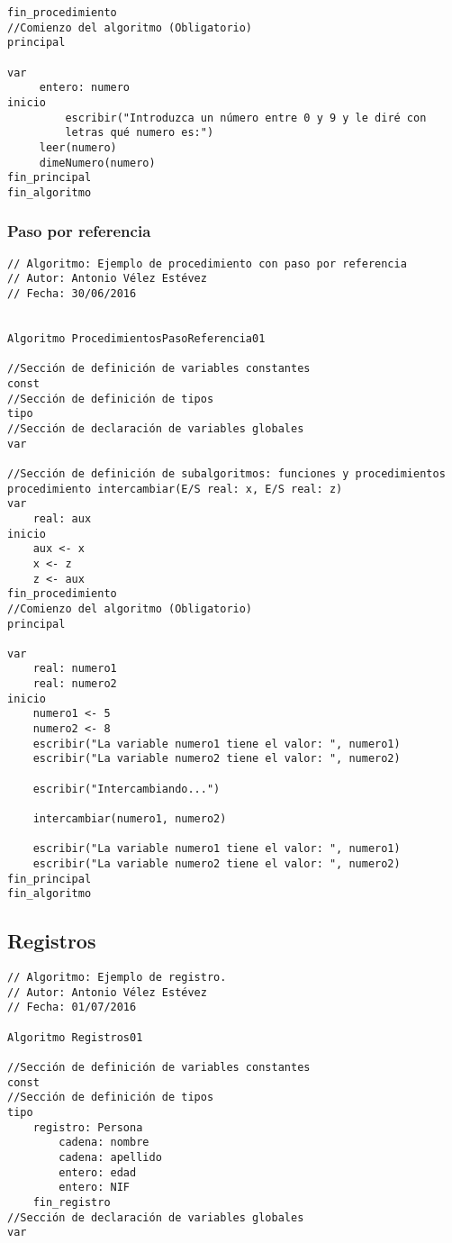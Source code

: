 \documentclass{article}
\begin{document}
\begin{appendices}
\begin{lstlisting}[language = pseudocodigoesp]
fin_procedimiento
//Comienzo del algoritmo (Obligatorio)
principal	

var
	 entero: numero
inicio 	
         escribir("Introduzca un número entre 0 y 9 y le diré con
         letras qué numero es:")
	 leer(numero)
	 dimeNumero(numero)
fin_principal
fin_algoritmo
\end{lstlisting}
\subsubsection{Paso por referencia}
\begin{lstlisting}[language = pseudocodigoesp]
// Algoritmo: Ejemplo de procedimiento con paso por referencia
// Autor: Antonio Vélez Estévez
// Fecha: 30/06/2016

 
Algoritmo ProcedimientosPasoReferencia01

//Sección de definición de variables constantes
const 
//Sección de definición de tipos
tipo
//Sección de declaración de variables globales	
var

//Sección de definición de subalgoritmos: funciones y procedimientos	
procedimiento intercambiar(E/S real: x, E/S real: z)
var
	real: aux
inicio 
	aux <- x
	x <- z
	z <- aux
fin_procedimiento
//Comienzo del algoritmo (Obligatorio)
principal	

var
	real: numero1
	real: numero2
inicio 	
	numero1 <- 5
	numero2 <- 8
	escribir("La variable numero1 tiene el valor: ", numero1)
	escribir("La variable numero2 tiene el valor: ", numero2)
	
	escribir("Intercambiando...")
	
	intercambiar(numero1, numero2)
	
	escribir("La variable numero1 tiene el valor: ", numero1)
	escribir("La variable numero2 tiene el valor: ", numero2)
fin_principal
fin_algoritmo
\end{lstlisting}
\subsection{Registros}
\begin{lstlisting}[language = pseudocodigoesp]
// Algoritmo: Ejemplo de registro.
// Autor: Antonio Vélez Estévez
// Fecha: 01/07/2016
 
Algoritmo Registros01

//Sección de definición de variables constantes
const 
//Sección de definición de tipos
tipo
	registro: Persona
		cadena: nombre
		cadena: apellido
		entero: edad
		entero: NIF
	fin_registro
//Sección de declaración de variables globales	
var


\end{lstlisting}
\end{appendices}
\end{document}
